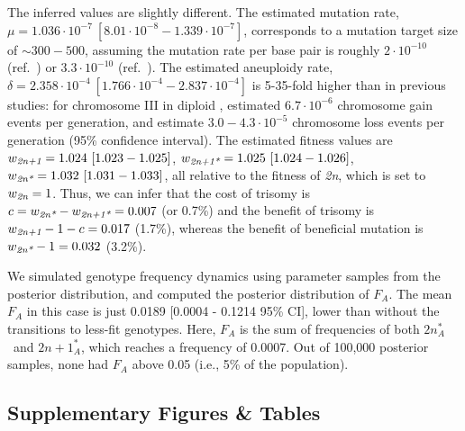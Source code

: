 \documentclass[12pt]{extarticle}
\newcommand{\euwt}{\emph{2n}}
\newcommand{\anwt}{\emph{2n+1}}
\newcommand{\eumt}{\emph{2n*}}
\newcommand{\eumtA}{\emph{$2n^*_A$}}
\newcommand{\anmt}{\emph{2n+1*}}
\begin{document}
The inferred values are slightly different.
The estimated mutation rate, $\mu=1.036\cdot10^{-7}\ [8.01\cdot10^{-8}-1.339\cdot10^{-7}]$, corresponds to a mutation target size of $\sim 300-500$, assuming the mutation rate per base pair is roughly $2\cdot10^{-10}$ (ref.~\citep{Zhu2014}) or $3.3\cdot10^{-10}$ (ref.~\citep{Lynch2008}).
The estimated aneuploidy rate, $\delta=2.358\cdot10^{-4}\ [1.766\cdot10^{-4}-2.837\cdot10^{-4}]$ is 5-35-fold higher than in previous studies: for chromosome III in diploid \yeast, \citet{Zhu2014} estimated $6.7\cdot10^{-6}$ chromosome gain events per generation, and \citet{Kumaran2013} estimate $3.0-4.3\cdot10^{-5}$ chromosome loss events per generation (95\% confidence interval).
The estimated fitness values are 
$w_{\anwt}=1.024\ [1.023-1.025]$,
$w_{\anmt}=1.025\ [1.024-1.026]$,
$w_{\eumt}=1.032\ [1.031-1.033]$, all relative to the fitness of \euwt, which is set to $w_{\euwt}=1$. 
Thus, we can infer that the cost of trisomy is $c = w_{\eumt}-w_{\anmt} = 0.007$ (or 0.7\%) and the benefit of trisomy is $w_{\anwt}-1-c=0.017$ (1.7\%), whereas the benefit of beneficial mutation is $w_{\eumt}-1=0.032$ (3.2\%).

We simulated genotype frequency dynamics using parameter samples from the posterior distribution, and computed the posterior distribution of $F_A$. 
The mean $F_A$ in this case is just 0.0189 [0.0004 - 0.1214 95\% CI], lower than without the transitions to less-fit genotypes. Here, $F_A$ is the sum of frequencies of both \eumtA\ and $2n+1^*_A$, which reaches a frequency of 0.0007. Out of 100,000 posterior samples, none had $F_A$ above 0.05 (i.e., 5\% of the population).


\newpage
\subsection*{Supplementary Figures \& Tables}
\end{document}
